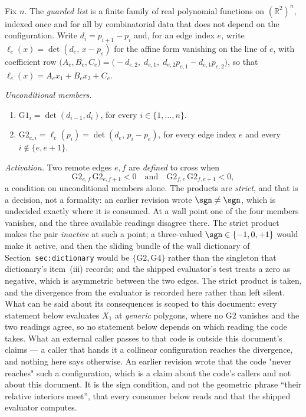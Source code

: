 \begin{definition}\label{CV:def:guarded}\leanok
Fix $n$. The \emph{guarded list} is a finite family of real polynomial functions
on $(\mathbb R^2)^n$, indexed once and for all by combinatorial data that does
not depend on the configuration. Write $d_i=p_{i+1}-p_i$ and, for an edge index
$e$, write $\ell_e(x)=\det(d_e,\,x-p_e)$ for the affine form vanishing on the
line of $e$, with coefficient row
$\bigl(A_e,B_e,C_e\bigr)=\bigl(-d_{e,2},\;d_{e,1},\;d_{e,2}p_{e,1}-d_{e,1}p_{e,2}\bigr)$,
so that $\ell_e(x)=A_ex_1+B_ex_2+C_e$.

\emph{Unconditional members.}
\begin{enumerate}
\item[(G1)] $\mathrm{G1}_i=\det(d_{i-1},d_i)$, for every $i\in\{1,\dots,n\}$.
\item[(G2)] $\mathrm{G2}_{e,i}=\ell_e(p_i)=\det(d_e,\,p_i-p_e)$, for every edge
index $e$ and every $i\notin\{e,e+1\}$.
\end{enumerate}

\emph{Activation.} Two remote edges $e,f$ are \emph{defined} to cross when
\[
   \mathrm{G2}_{e,f}\,\mathrm{G2}_{e,f+1}<0
   \quad\text{and}\quad
   \mathrm{G2}_{f,e}\,\mathrm{G2}_{f,e+1}<0 ,
\]
a condition on unconditional members alone. The products are \emph{strict}, and
that is a decision, not a formality: an earlier revision wrote
$\sgn\neq\sgn$, which is undecided exactly where it is consumed. At a wall
point one of the four members vanishes, and the three available readings
disagree there. The strict product makes the pair \emph{inactive} at such a
point; a three-valued $\sgn\in\{-1,0,+1\}$ would make it active, and then the
sliding bundle of the wall dictionary of
Section~\texttt{sec:dictionary} would be $\{\mathrm{G2},\mathrm{G4}\}$ rather than
the singleton that dictionary's item~(iii) records;
and the shipped evaluator's test treats a zero as negative, which is asymmetric
between the two edges. The strict product is taken, and the divergence from the
evaluator is recorded here rather than left silent. What can be said about its
consequences is scoped to this document: every statement below evaluates $X_1$
at \emph{generic} polygons, where no $\mathrm{G2}$ vanishes and the two
readings agree, so no statement below depends on which reading the code takes.
What an external caller passes to that code is outside this document's claims
--- a caller that hands it a collinear configuration reaches the divergence, and
nothing here says otherwise. An earlier revision wrote that the code "never
reaches" such a configuration, which is a claim about the code's callers and not
about this document. It is the sign
condition, and not the geometric phrase ``their relative interiors meet'', that
every consumer below reads and that the shipped evaluator computes.


\end{definition}
